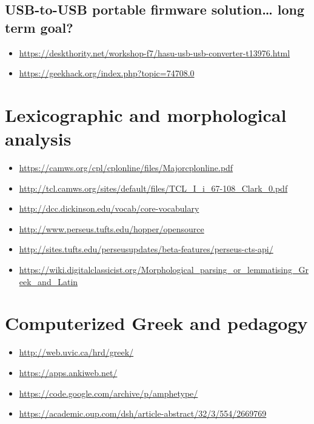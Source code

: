\documentclass[11pt]{article}
\begin{document}
\subsection{USB-to-USB portable firmware solution\ldots{} long term goal?}
\label{sec:org6a7edb7}

\begin{itemize}
\item \url{https://deskthority.net/workshop-f7/hasu-usb-usb-converter-t13976.html}
\item \url{https://geekhack.org/index.php?topic=74708.0}
\end{itemize}

\section{Lexicographic and morphological analysis}
\label{sec:org15ab676}

\begin{itemize}
\item \url{https://camws.org/cpl/cplonline/files/Majorcplonline.pdf}
\item \url{http://tcl.camws.org/sites/default/files/TCL\_I\_i\_67-108\_Clark\_0.pdf}
\item \url{http://dcc.dickinson.edu/vocab/core-vocabulary}
\item \url{http://www.perseus.tufts.edu/hopper/opensource}
\item \url{http://sites.tufts.edu/perseusupdates/beta-features/perseus-cts-api/}
\item \url{https://wiki.digitalclassicist.org/Morphological\_parsing\_or\_lemmatising\_Greek\_and\_Latin}
\end{itemize}

\section{Computerized Greek and pedagogy}
\label{sec:orgb27056c}

\begin{itemize}
\item \url{http://web.uvic.ca/hrd/greek/}
\item \url{https://apps.ankiweb.net/}
\item \url{https://code.google.com/archive/p/amphetype/}
\item \url{https://academic.oup.com/dsh/article-abstract/32/3/554/2669769}
\end{itemize}
\end{document}
